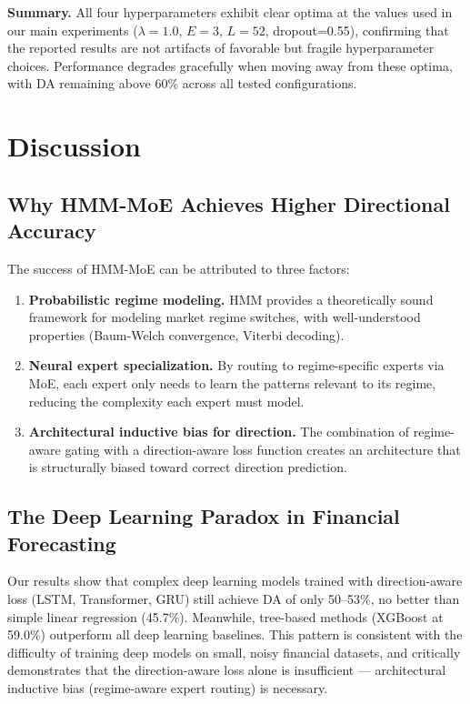 \documentclass[3p,times]{elsarticle}
\begin{document}
\textbf{Summary.} All four hyperparameters exhibit clear optima at the values used in our main experiments ($\lambda=1.0$, $E=3$, $L=52$, dropout=0.55), confirming that the reported results are not artifacts of favorable but fragile hyperparameter choices. Performance degrades gracefully when moving away from these optima, with DA remaining above 60\% across all tested configurations.

\section{Discussion}
\label{sec:discussion}

\subsection{Why HMM-MoE Achieves Higher Directional Accuracy}

The success of HMM-MoE can be attributed to three factors:

\begin{enumerate}
\item \textbf{Probabilistic regime modeling.} HMM provides a theoretically sound framework for modeling market regime switches, with well-understood properties (Baum-Welch convergence, Viterbi decoding).

\item \textbf{Neural expert specialization.} By routing to regime-specific experts via MoE, each expert only needs to learn the patterns relevant to its regime, reducing the complexity each expert must model.

\item \textbf{Architectural inductive bias for direction.} The combination of regime-aware gating with a direction-aware loss function creates an architecture that is structurally biased toward correct direction prediction.
\end{enumerate}

\subsection{The Deep Learning Paradox in Financial Forecasting}

Our results show that complex deep learning models trained with direction-aware loss (LSTM, Transformer, GRU) still achieve DA of only 50--53\%, no better than simple linear regression (45.7\%). Meanwhile, tree-based methods (XGBoost at 59.0\%) outperform all deep learning baselines. This pattern is consistent with the difficulty of training deep models on small, noisy financial datasets, and critically demonstrates that the direction-aware loss alone is insufficient --- architectural inductive bias (regime-aware expert routing) is necessary.
\end{document}
